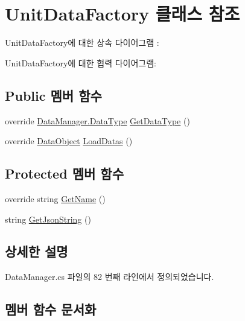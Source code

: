 \hypertarget{class_unit_data_factory}{}\section{Unit\+Data\+Factory 클래스 참조}
\label{class_unit_data_factory}


Unit\+Data\+Factory에 대한 상속 다이어그램 \+: 


Unit\+Data\+Factory에 대한 협력 다이어그램\+:
\subsection*{Public 멤버 함수}
\begin{DoxyCompactItemize}
\item 
override \hyperlink{class_data_manager_ac9cb5bf021d3ebcc7f3eaa4bf5393408}{Data\+Manager.\+Data\+Type} \hyperlink{class_unit_data_factory_af028480546af2388352b306060033720}{Get\+Data\+Type} ()
\item 
override \hyperlink{class_data_object}{Data\+Object} \hyperlink{class_unit_data_factory_a048e5ca3d28d88eddf55537a4930f1df}{Load\+Datas} ()
\end{DoxyCompactItemize}
\subsection*{Protected 멤버 함수}
\begin{DoxyCompactItemize}
\item 
override string \hyperlink{class_unit_data_factory_a52113bfa2f284502f8f6a2daf9ec5352}{Get\+Name} ()
\item 
string \hyperlink{class_data_factory_a5f040ba1715a670e29f45e07d22b4d5b}{Get\+Json\+String} ()
\end{DoxyCompactItemize}


\subsection{상세한 설명}


Data\+Manager.\+cs 파일의 82 번째 라인에서 정의되었습니다.



\subsection{멤버 함수 문서화}
